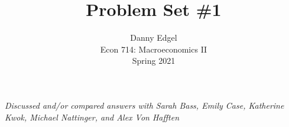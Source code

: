 \documentclass{article}
\begin{document}
\title{	Problem Set \#1 }
\author{ 	Danny Edgel 					\\ 
			Econ 714: Macroeconomics II		\\
			Spring 2021						\\
		}
\maketitle\thispagestyle{empty}


\noindent\textit{Discussed and/or compared answers with Sarah Bass, Emily Case, Katherine Kwok, Michael Nattinger, and Alex Von Hafften}
 \\

\end{document}
